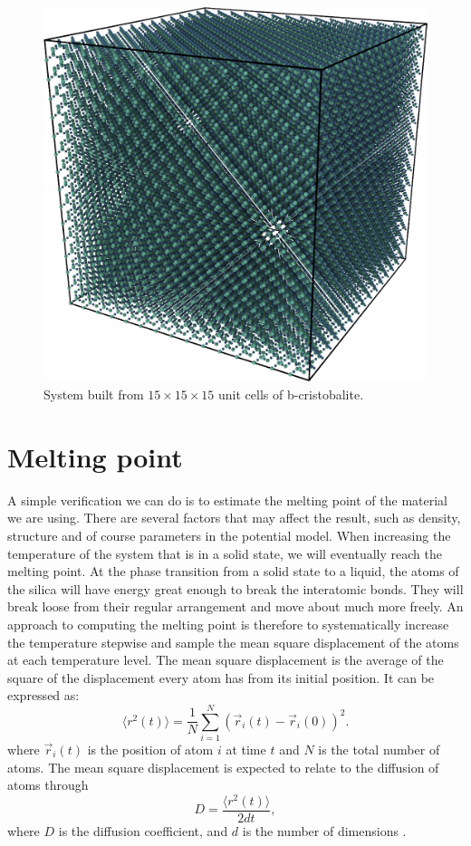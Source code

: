 \documentclass[twoside,english]{uiofysmaster}
\newcommand\lr[1]{\left(#1\right)}
\begin{document}
\begin{figure}[H]
	\centering
	\includegraphics[width=0.5\linewidth]{figures/CreatingSystem/cube}
	\caption{System built from $15\times15\times15$ unit cells of b-cristobalite.}
	\label{fig:hugeCube}
\end{figure}


\section{Melting point}\label{sec:meltingPoint}
A simple verification we can do is to estimate the melting point of the material we are using. 
There are several factors that may affect the result, such as density, structure and of course parameters in the potential model. 
When increasing the temperature of the system that is in a solid state, we will eventually reach the melting point.
At the phase transition from a solid state to a liquid, the atoms of the silica will have energy great enough to break the interatomic bonds. 
They will break loose from their regular arrangement and move about much more freely. 
An approach to computing the melting point is therefore to systematically increase the temperature stepwise and sample the mean square displacement of the atoms at each temperature level.  
The mean square displacement is the average of the square of the displacement every atom has from its initial position. It can be expressed as:
\begin{equation}
\langle r^2(t)\rangle = \frac{1}{N}\sum_{i=1}^{N}\lr{\vec{r}_i(t)-\vec{r}_i(0)}^2. \label{eq: diffusion constant}
\end{equation}
where $\vec{r}_i(t)$ is the position of atom $i$ at time $t$ and $N$ is the total number of atoms. 
The mean square displacement is expected to relate to the diffusion of atoms through
\begin{equation}
	D = \frac{\langle r^2(t)\rangle}{2dt},
\end{equation}
where $D$ is the diffusion coefficient, and $d$ is the number of dimensions \cite{EinsteinBrowninanMotion}. 
\end{document}
